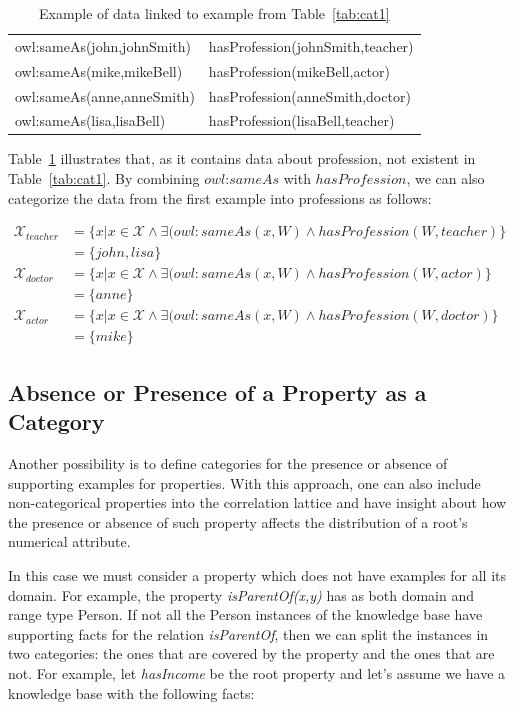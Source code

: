 \begin{table}[h!]
 \begin{center}
 \caption{Example of data linked to example from Table~\ref{tab:cat1}}
  \begin{tabular}{l l}
    \toprule
    owl:sameAs(john,johnSmith)& hasProfession(johnSmith,teacher)  \\
    owl:sameAs(mike,mikeBell) & hasProfession(mikeBell,actor) 	 \\
    owl:sameAs(anne,anneSmith)& hasProfession(anneSmith,doctor)	 \\
    owl:sameAs(lisa,lisaBell) & hasProfession(lisaBell,teacher)  \\
    \bottomrule
  \end{tabular}
 \label{tab:cat2}
 \end{center}
\end{table}

Table~\ref{tab:cat2} illustrates that, as it contains data about profession, not existent in Table~\ref{tab:cat1}.
By combining $owl$:$sameAs$ with $hasProfession$, we can also categorize the data from the first example into
professions as follows:

\begin{align*}
\mathcal{X}_{teacher}&=\{ x|x \in \mathcal{X} \wedge \exists (owl:sameAs(x,W) \wedge hasProfession(W,teacher)\} \\
  &=\{john,lisa\} \\
\mathcal{X}_{doctor}&=\{ x|x \in \mathcal{X} \wedge \exists (owl:sameAs(x,W) \wedge hasProfession(W,actor)\} \\
  &=\{anne\} \\
\mathcal{X}_{actor}&=\{ x|x \in \mathcal{X} \wedge \exists (owl:sameAs(x,W) \wedge hasProfession(W,doctor)\} \\
  &=\{mike\}
\end{align*}


\subsection{Absence or Presence of a Property as a Category}

Another possibility is to define categories for the presence or absence of supporting examples for properties. With
this approach, one can also include non-categorical properties into the correlation lattice and have insight about how
the presence or absence of such property affects the distribution of a root's numerical attribute.

In this case we must consider a property which does not have examples for all its domain. For example, the property
\emph{isParentOf(x,y)} has as both domain and range type Person. If not all the Person instances of the knowledge base
have supporting facts for the relation \emph{isParentOf}, then we can split the instances in two categories: the ones
that are covered by the property and the ones that are not. For example, let \emph{hasIncome} be the root property and
let's assume we have a knowledge base with the following facts:

